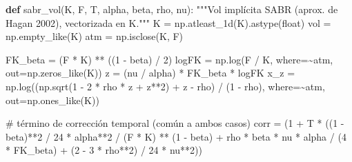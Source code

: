 \documentclass[
  spanish,
  letterpaper,
  DIV=11,
  numbers=noendperiod]{scrreprt}
\newenvironment{Shaded}{\begin{snugshade}}{\end{snugshade}}
\newcommand{\BuiltInTok}[1]{\textcolor[rgb]{0.00,0.23,0.31}{#1}}
\newcommand{\CommentTok}[1]{\textcolor[rgb]{0.37,0.37,0.37}{#1}}
\newcommand{\DecValTok}[1]{\textcolor[rgb]{0.68,0.00,0.00}{#1}}
\newcommand{\KeywordTok}[1]{\textcolor[rgb]{0.00,0.23,0.31}{\textbf{#1}}}
\newcommand{\NormalTok}[1]{\textcolor[rgb]{0.00,0.23,0.31}{#1}}
\newcommand{\OperatorTok}[1]{\textcolor[rgb]{0.37,0.37,0.37}{#1}}
\begin{document}
\begin{Shaded}
\begin{Highlighting}[]
\KeywordTok{def}\NormalTok{ sabr\_vol(K, F, T, alpha, beta, rho, nu):}
    \CommentTok{"""Vol implícita SABR (aprox. de Hagan 2002), vectorizada en K."""}
\NormalTok{    K }\OperatorTok{=}\NormalTok{ np.atleast\_1d(K).astype(}\BuiltInTok{float}\NormalTok{)}
\NormalTok{    vol }\OperatorTok{=}\NormalTok{ np.empty\_like(K)}
\NormalTok{    atm }\OperatorTok{=}\NormalTok{ np.isclose(K, F)}

\NormalTok{    FK\_beta }\OperatorTok{=}\NormalTok{ (F }\OperatorTok{*}\NormalTok{ K) }\OperatorTok{**}\NormalTok{ ((}\DecValTok{1} \OperatorTok{{-}}\NormalTok{ beta) }\OperatorTok{/} \DecValTok{2}\NormalTok{)}
\NormalTok{    logFK }\OperatorTok{=}\NormalTok{ np.log(F }\OperatorTok{/}\NormalTok{ K, where}\OperatorTok{=\textasciitilde{}}\NormalTok{atm, out}\OperatorTok{=}\NormalTok{np.zeros\_like(K))}
\NormalTok{    z }\OperatorTok{=}\NormalTok{ (nu }\OperatorTok{/}\NormalTok{ alpha) }\OperatorTok{*}\NormalTok{ FK\_beta }\OperatorTok{*}\NormalTok{ logFK}
\NormalTok{    x\_z }\OperatorTok{=}\NormalTok{ np.log((np.sqrt(}\DecValTok{1} \OperatorTok{{-}} \DecValTok{2} \OperatorTok{*}\NormalTok{ rho }\OperatorTok{*}\NormalTok{ z }\OperatorTok{+}\NormalTok{ z}\OperatorTok{**}\DecValTok{2}\NormalTok{) }\OperatorTok{+}\NormalTok{ z }\OperatorTok{{-}}\NormalTok{ rho) }\OperatorTok{/}\NormalTok{ (}\DecValTok{1} \OperatorTok{{-}}\NormalTok{ rho),}
\NormalTok{                 where}\OperatorTok{=\textasciitilde{}}\NormalTok{atm, out}\OperatorTok{=}\NormalTok{np.ones\_like(K))}

    \CommentTok{\# término de corrección temporal (común a ambos casos)}
\NormalTok{    corr }\OperatorTok{=}\NormalTok{ (}\DecValTok{1} \OperatorTok{+}\NormalTok{ T }\OperatorTok{*}\NormalTok{ ((}\DecValTok{1} \OperatorTok{{-}}\NormalTok{ beta)}\OperatorTok{**}\DecValTok{2} \OperatorTok{/} \DecValTok{24} \OperatorTok{*}\NormalTok{ alpha}\OperatorTok{**}\DecValTok{2} \OperatorTok{/}\NormalTok{ (F }\OperatorTok{*}\NormalTok{ K) }\OperatorTok{**}\NormalTok{ (}\DecValTok{1} \OperatorTok{{-}}\NormalTok{ beta)}
                     \OperatorTok{+}\NormalTok{ rho }\OperatorTok{*}\NormalTok{ beta }\OperatorTok{*}\NormalTok{ nu }\OperatorTok{*}\NormalTok{ alpha }\OperatorTok{/}\NormalTok{ (}\DecValTok{4} \OperatorTok{*}\NormalTok{ FK\_beta)}
                     \OperatorTok{+}\NormalTok{ (}\DecValTok{2} \OperatorTok{{-}} \DecValTok{3} \OperatorTok{*}\NormalTok{ rho}\OperatorTok{**}\DecValTok{2}\NormalTok{) }\OperatorTok{/} \DecValTok{24} \OperatorTok{*}\NormalTok{ nu}\OperatorTok{**}\DecValTok{2}\NormalTok{))}


\end{Highlighting}
\end{Shaded}
\end{document}

